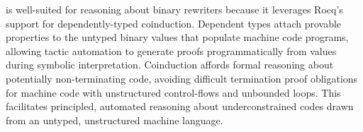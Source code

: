 \Picinae{} is well-suited for reasoning about binary rewriters because it leverages Rocq's support for dependently-typed coinduction.
Dependent types attach provable properties to the untyped binary values that populate machine code programs, allowing tactic automation to generate proofs programmatically from values during symbolic interpretation.
Coinduction affords formal reasoning about potentially non-terminating code, avoiding difficult termination proof obligations for machine code with unstructured control-flows and unbounded loops.
This facilitates principled, automated reasoning about underconstrained codes drawn from an untyped, unstructured machine language.
